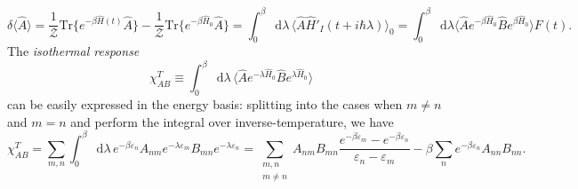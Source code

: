 \documentclass[10pt,nofootinbib,letterpaper]{revtex4}
\newcommand*\dd{\mathop{}\!\mathrm{d}}
\def\Z{\mathcal{Z}}
\begin{document}
		\begin{equation}\label{1.1.5}
			\delta \langle\hat A\rangle=\dfrac{1}{\Z}\mathrm{Tr}\{e^{-\beta\hat H(t)}\hat A\}-\dfrac{1}{\Z}\mathrm{Tr}\{e^{-\beta\hat H_0}\hat A\}=\int_0^\beta\dd\lambda\,\langle\hat A\hat H'_I(t+i\hbar\lambda)\rangle_0=\int_0^\beta\dd\lambda \langle\hat A e^{-\beta\hat H_0}\hat B e^{\beta\hat H_0}\rangle F(t).
		\end{equation}
		The \emph{isothermal response}
		\begin{equation}\label{1.1.6}
			\chi_{AB}^T\equiv\int_0^\beta\dd\lambda\,\langle\hat A e^{-\lambda\hat H_0}\hat Be^{\lambda\hat H_0}\rangle
		\end{equation}
		 can be easily expressed in the energy basis: splitting into the cases when $m\neq n$ and $m=n$ and perform the integral over inverse-temperature, we have
		 \begin{equation}\label{1.1.7}
		 	\chi_{AB}^T=\sum_{m,n}\int_0^\beta\dd\lambda\,e^{-\beta \varepsilon_n}A_{nm}e^{-\lambda \varepsilon_m}B_{mn}e^{-\lambda \varepsilon_n}=\sum_{\substack{m,n\\m\neq n}}A_{nm}B_{mn}\dfrac{e^{-\beta \varepsilon_m}-e^{-\beta \varepsilon_n}}{\varepsilon_n- \varepsilon_m}-\beta\sum_n e^{-\beta \varepsilon_n}A_{nn}B_{nn}.
		 \end{equation}
		 
\end{document}

